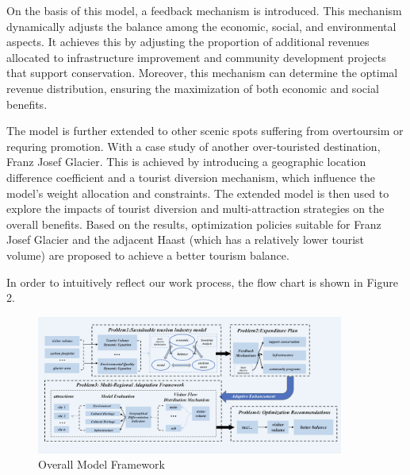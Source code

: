\documentclass{mcmthesis}
\begin{document}
On the basis of this model, a feedback mechanism is introduced. This mechanism dynamically adjusts the balance among the economic, social, and environmental aspects.
It achieves this by adjusting the proportion of additional revenues allocated to infrastructure improvement and community development projects that support conservation.
Moreover, this mechanism can determine the optimal revenue distribution, ensuring the maximization of both economic and social benefits.

The model is further extended to other scenic spots suffering from overtoursim or requring promotion. With a case study of another over-touristed destination, 
Franz Josef Glacier. This is achieved by introducing a geographic location difference coefficient and a tourist diversion mechanism, which influence the model's weight allocation and constraints.
The extended model is then used to explore the impacts of tourist diversion and multi-attraction strategies on the overall benefits. 
Based on the results, optimization policies suitable for Franz Josef Glacier and the adjacent Haast (which has a relatively lower tourist volume) are proposed to achieve a better tourism balance.

In order to intuitively reflect our work process, the flow chart is shown in Figure 2.

\begin{figure}[H]
  \centering
  \includegraphics[width=0.9\textwidth]{figures/overall_flow.png}
  \caption{Overall Model Framework}
  \label{Fig.2}
\end{figure}
\end{document}
